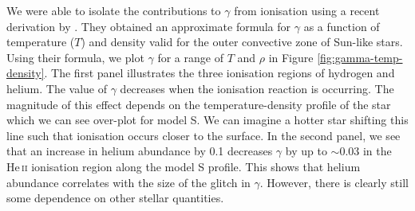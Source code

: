 We were able to isolate the contributions to \(\gamma\) from ionisation using a recent derivation by \citet{Houdayer.Reese.ea2021}. They obtained an approximate formula for \(\gamma\) as a function of temperature (\(T\)) and density valid for the outer convective zone of Sun-like stars. Using their formula, we plot \(\gamma\) for a range of \(T\) and \(\rho\) in Figure \ref{fig:gamma-temp-density}. The first panel illustrates the three ionisation regions of hydrogen and helium. The value of \(\gamma\) decreases when the ionisation reaction is occurring. The magnitude of this effect depends on the temperature-density profile of the star which we can see over-plot for model S. We can imagine a hotter star shifting this line such that ionisation occurs closer to the surface. In the second panel, we see that an increase in helium abundance by 0.1 decreases \(\gamma\) by up to \(\sim 0.03\) in the He\,\textsc{ii} ionisation region along the model S profile. This shows that helium abundance correlates with the size of the glitch in \(\gamma\). However, there is clearly still some dependence on other stellar quantities.

